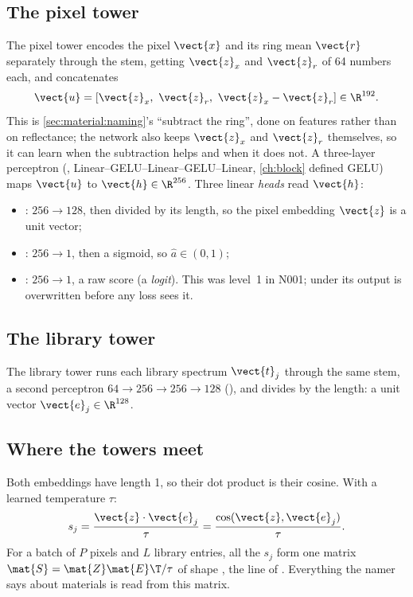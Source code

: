\subsection{The pixel tower}

The pixel tower encodes the pixel $\vect{x}$ and its ring mean $\vect{r}$ separately through the stem, getting
$\vect{z}_x$ and $\vect{z}_r$ of 64 numbers each, and concatenates
\begin{equation}
\vect{u}=[\vect{z}_x,\ \vect{z}_r,\ \vect{z}_x-\vect{z}_r]\in\R^{192}.
\label{eq:namer:concat}
\end{equation}
This is \cref{sec:material:naming}'s ``subtract the ring'', done on features rather than on reflectance; the network
also keeps $\vect{z}_x$ and $\vect{z}_r$ themselves, so it can learn when the subtraction helps and when it does not.
A three-layer perceptron (, Linear--GELU--Linear--GELU--Linear, \cref{ch:block} defined GELU) maps
$\vect{u}$ to $\vect{h}\in\R^{256}$. Three linear \emph{heads} read $\vect{h}$:
\begin{itemize}
\item {}: $256\to128$, then divided by its length, so the pixel embedding $\vect{z}$ is a unit vector;
\item {}: $256\to1$, then a sigmoid, so $\hat a\in(0,1)$;
\item {}: $256\to1$, a raw score (a \emph{logit}). This was level~1 in N001; under
 its output is overwritten before any loss sees it.
\end{itemize}

\subsection{The library tower}

The library tower runs each library spectrum $\vect{t}_j$ through the same stem, a second perceptron
$64\to256\to256\to128$ (), and divides by the length: a unit vector $\vect{e}_j\in\R^{128}$.

\subsection{Where the towers meet}

Both embeddings have length 1, so their dot product is their cosine. With a learned temperature $\tau$:
\begin{equation}
s_j=\frac{\vect{z}\cdot\vect{e}_j}{\tau}=\frac{\cos(\vect{z},\vect{e}_j)}{\tau}.
\label{eq:namer:sj}
\end{equation}
For a batch of $P$ pixels and $L$ library entries, all the $s_j$ form one matrix
$\mat{S}=\mat{Z}\mat{E}\T/\tau$ of shape , the line  of
. Everything the namer says about materials is read from this matrix.

